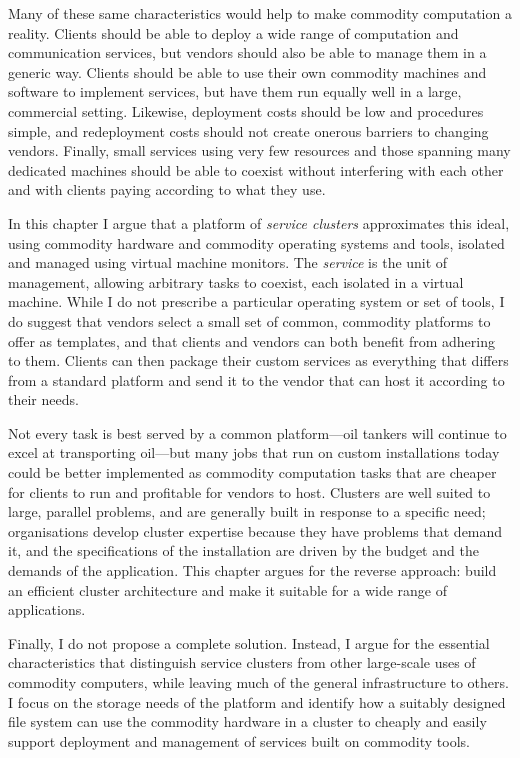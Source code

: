 Many of these same characteristics would help to make commodity computation a reality. Clients should be able to deploy a wide range of computation and communication services, but vendors should also be able to manage them in a generic way. Clients should be able to use their own commodity machines and software to implement services, but have them run equally well in a large, commercial setting. Likewise, deployment costs should be low and procedures simple, and redeployment costs should not create onerous barriers to changing vendors. Finally, small services using very few resources and those spanning many dedicated machines should be able to coexist without interfering with each other and with clients paying according to what they use.

In this chapter I argue that a platform of \emph{service clusters} approximates this ideal, using commodity hardware and commodity operating systems and tools, isolated and managed using virtual machine monitors. The \emph{service} is the unit of management, allowing arbitrary tasks to coexist, each isolated in a virtual machine. While I do not prescribe a particular operating system or set of tools, I do suggest that vendors select a small set of common, commodity platforms to offer as templates, and that clients and vendors can both benefit from adhering to them. Clients can then package their custom services as everything that differs from a standard platform and send it to the vendor that can host it according to their needs.

Not every task is best served by a common platform---oil tankers will continue to excel at transporting oil---but many jobs that run on custom installations today could be better implemented as commodity computation tasks that are cheaper for clients to run and profitable for vendors to host. Clusters are well suited to large, parallel problems, and are generally built in response to a specific need; organisations develop cluster expertise because they have problems that demand it, and the specifications of the installation are driven by the budget and the demands of the application. This chapter argues for the reverse approach: build an efficient cluster architecture and make it suitable for a wide range of applications.

Finally, I do not propose a complete solution. Instead, I argue for the essential characteristics that distinguish service clusters from other large-scale uses of commodity computers, while leaving much of the general infrastructure to others. I focus on the storage needs of the platform and identify how a suitably designed file system can use the commodity hardware in a cluster to cheaply and easily support deployment and management of services built on commodity tools.

